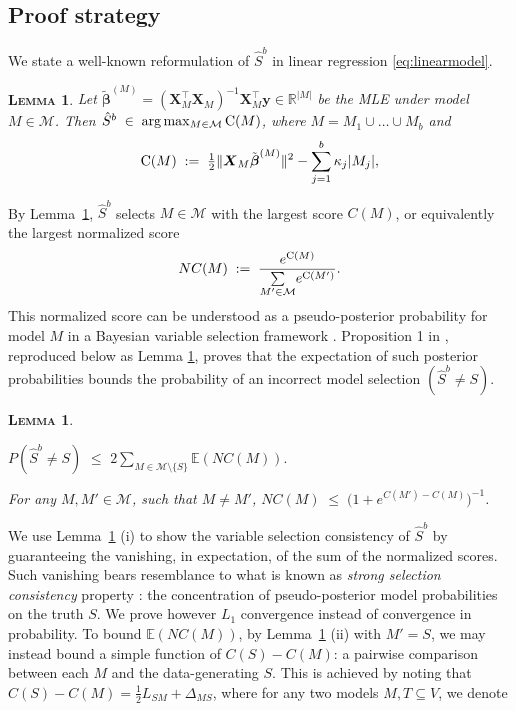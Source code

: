 \documentclass[aos]{imsart}
\theoremstyle{plain}
\newtheorem{lem}[thm]{\textsc{Lemma}}
\newcommand{\E}{\mathbb{E}}
\newcommand{\R}{\mathbb{R}}
\newcommand{\M}{\mathcal{M}}
\newcommand{\bs}{\boldsymbol}
\begin{document}
\subsection{Proof strategy}
\label{ssec:regression_proof_strategy}


We state a well-known
reformulation of $\hat S^b$ in linear regression \eqref{eq:linearmodel}. 
\begin{lem}\label{lem:useful-reformulation} Let $\tilde{\bs \beta}^{(M)}= (\bs X_{\!\!M}^\top \bs X_{\!\!M})^{-1}\bs X_{\!\!M}^\top\bs y \in \R^{|M|}$ be the MLE under model $M\in \M$. Then $\hat S^b\;\in\;\arg\max_{M\in \M} {\rm C}(M)$, where $M=M_1\cup \ldots\cup M_b$ and
\begin{equation}\label{eq:CM}
    {\rm C}(M)\;: =\;\tfrac{1}{2}\|\bs X_M\tilde{\bs\beta}^{(M)}\|^2-\sum_{j=1}^b\kappa_j |M_j|,
\end{equation}
\end{lem}
By Lemma~\ref{lem:useful-reformulation}, $\hat S^b$ selects
$M\in \M$ with the largest score $C(M)$, or equivalently the largest normalized score
\begin{equation}\label{eq:normalizedscore}
    NC(M)\;:=\;\frac{e^{{\rm C}(M)}}{\underset{M' \in \M}{\sum} e^{{\rm C}(M')}}.
\end{equation}
This normalized score can be understood as a pseudo-posterior probability for model $M$ in a Bayesian variable selection framework \citep{BIC}.
Proposition 1 in \cite{rossell2022concentration}, reproduced below as Lemma \ref{lem:L0toL1convergence}, proves that the expectation of such posterior probabilities bounds the probability of an incorrect model selection $(\hat S^b\neq S)$. 

\begin{lem}\label{lem:L0toL1convergence}
\begin{longlist}
\item 
$P(\hat{S}^{b} \neq S) \,\,\leq \,\, 2 \sum_{M \in \M\setminus \{S\}} \E\left(NC(M)\right).$
\item  For any $M,M'\in\M$, such that $M\neq M'$, 
$NC(M)\;\leq \;\big(1+e^{C(M')-C(M)}\big)^{-1}$.
\end{longlist}
\end{lem}
We use  Lemma~\ref{lem:L0toL1convergence} (i) to show the variable selection consistency of $\hat S^b$ by guaranteeing the vanishing, in expectation, of the sum of the normalized scores. Such vanishing bears resemblance to what is known as \emph{strong selection consistency} property \citep{narisettyhe2014}: the concentration of pseudo-posterior model probabilities on the truth $S$. We prove however $L_1$ convergence instead of convergence in probability.
To bound $\E(NC(M))$, by Lemma~\ref{lem:L0toL1convergence} (ii) with $M'=S$, we may instead bound a simple function of $C(S)-C(M)$: a pairwise comparison between each $M$ and the data-generating $S$. \color{black}
This is achieved by noting that $C(S)-C(M)=\tfrac12 L_{SM}+\Delta_{MS}$, where for any two models $M,T\subseteq V$, we denote
\end{document}
